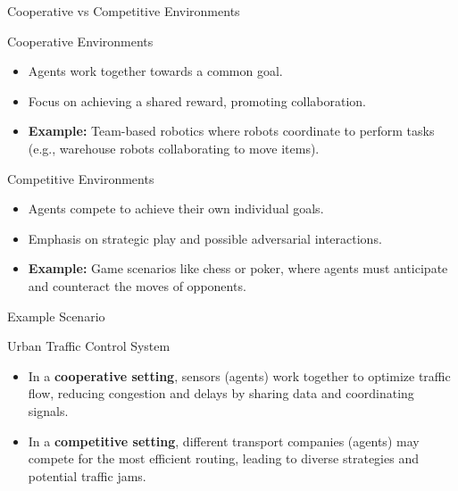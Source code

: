\documentclass[aspectratio=169]{beamer}
\begin{document}
\begin{frame}[fragile]{Cooperative vs Competitive Environments}
    \begin{block}{Cooperative Environments}
        \begin{itemize}
            \item Agents work together towards a common goal.
            \item Focus on achieving a shared reward, promoting collaboration.
            \item \textbf{Example:} Team-based robotics where robots coordinate to perform tasks (e.g., warehouse robots collaborating to move items).
        \end{itemize}
    \end{block}

    \begin{block}{Competitive Environments}
        \begin{itemize}
            \item Agents compete to achieve their own individual goals.
            \item Emphasis on strategic play and possible adversarial interactions.
            \item \textbf{Example:} Game scenarios like chess or poker, where agents must anticipate and counteract the moves of opponents.
        \end{itemize}
    \end{block}
\end{frame}

\begin{frame}[fragile]{Example Scenario}
    \begin{block}{Urban Traffic Control System}
        \begin{itemize}
            \item In a \textbf{cooperative setting}, sensors (agents) work together to optimize traffic flow, reducing congestion and delays by sharing data and coordinating signals.
            \item In a \textbf{competitive setting}, different transport companies (agents) may compete for the most efficient routing, leading to diverse strategies and potential traffic jams.
        \end{itemize}
    \end{block}
\end{frame}
\end{document}
